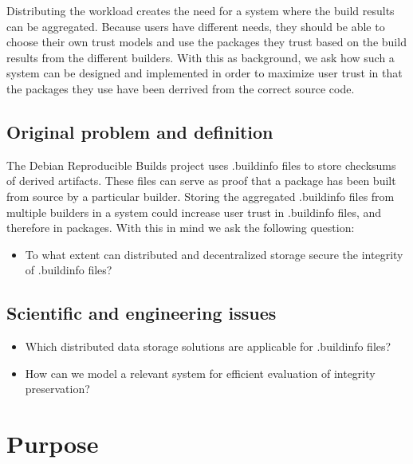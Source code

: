 \documentclass[english, biblatex, digitaloutput]{kththesis}
\begin{document}
Distributing the workload creates the need for a system where the build results can be aggregated. Because users have different needs, they should be able to choose their own trust models and use the packages they trust based on the build results from the different builders. With this as background, we ask how such a system can be designed and implemented in order to maximize user trust in that the packages they use have been derrived from the correct source code.

\subsection{Original problem and definition}
\label{sec:researchQuestion}

The Debian Reproducible Builds project uses .buildinfo files to store checksums of derived artifacts. These files can serve as proof that a package has been built from source by a particular builder. Storing the aggregated .buildinfo files from multiple builders in a system could increase user trust in .buildinfo files, and therefore in packages. With this in mind we ask the following question:

\begin{itemize}
	\item To what extent can distributed and decentralized storage secure the integrity of .buildinfo files?
\end{itemize}

\subsection{Scientific and engineering issues}
\label{subsec:scientific-issues}
\begin{itemize}
	\item Which distributed data storage solutions are applicable for .buildinfo files?
	\item How can we model a relevant system for efficient evaluation of integrity preservation?
\end{itemize}

\section{Purpose}
\end{document}
